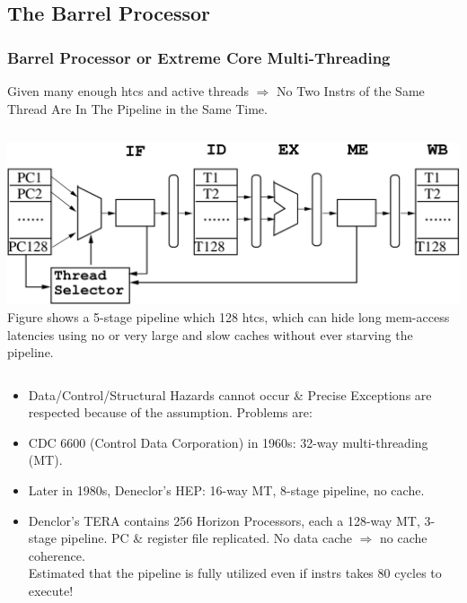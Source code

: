 \documentclass{beamer}
\renewcommand{\emph}[1]{\textcolor{structure}{#1}}
\newcommand{\emp}[1]{\textcolor{DikuRed}{ #1}}
\begin{document}
\subsection{The Barrel Processor}

\begin{frame}[fragile,t]
\frametitle{Barrel Processor or Extreme Core Multi-Threading}

\alert{Given many enough {\sc htc}s and active threads $\Rightarrow$ 
No Two Instrs of the Same Thread Are In The Pipeline in the Same Time.}

\begin{scriptsize}
\begin{columns}
\includegraphics[width=59ex]{Figures/Barrel}
Figure shows a 5-stage pipeline which 128 {\sc htc}s, which can
        hide long mem-access latencies using no or very large 
        and slow caches without ever starving the pipeline.
\end{columns}

\pause

\begin{itemize}
\item Data/Control/Structural Hazards cannot occur \& Precise Exceptions are
        respected because of the \alert{assumption}.  \alert{Problems are}:
    \begin{itemize}\pause
    \end{itemize}
\pause
\item CDC 6600 (Control Data Corporation) in \alert{1960s}: 32-way multi-threading (MT).
\item Later in 1980s, Deneclor's HEP: 16-way MT, 8-stage pipeline,  no cache.
\item Denclor's TERA contains 256 Horizon Processors, each a 128-way MT, 3-stage pipeline. 
        PC \& register file replicated.
        No data cache $\Rightarrow$ no cache coherence.\\\emp{Estimated that the pipeline
        is fully utilized even if instrs takes 80 cycles to execute!}
\end{itemize} 
\end{scriptsize}


\end{frame}
\end{document}

